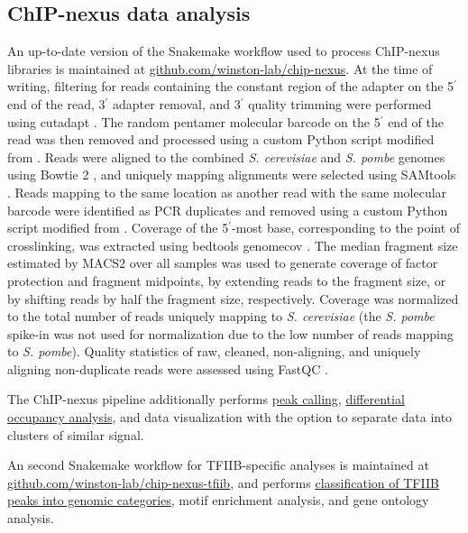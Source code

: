 \subsection{ChIP-nexus data analysis}
\label{subsec:chipnexus}
An up-to-date version of the Snakemake \citep{koster2012} workflow used to process ChIP-nexus libraries is maintained at \href{https://github.com/winston-lab/chip-nexus}{github.com/winston-lab/chip-nexus}.
At the time of writing, filtering for reads containing the constant region of the adapter on the 5$^\prime$ end of the read, 3$^\prime$ adapter removal, and 3$^\prime$ quality trimming were performed using cutadapt \citep{martin2011}.
The random pentamer molecular barcode on the 5$^\prime$ end of the read was then removed and processed using a custom Python script modified from \citet{mayer2015}.
Reads were aligned to the combined \textit{S. cerevisiae} and \textit{S. pombe} genomes using Bowtie 2 \citep{langmead2012}, and uniquely mapping alignments were selected using SAMtools \citep{li2009}.
Reads mapping to the same location as another read with the same molecular barcode were identified as PCR duplicates and removed using a custom Python script modified from \citet{mayer2015}.
Coverage of the 5$^\prime$-most base, corresponding to the point of crosslinking, was extracted using bedtools genomecov \citep{quinlan2010}.
The median fragment size estimated by MACS2 \citep{zhang2008} over all samples was used to generate coverage of factor protection and fragment midpoints, by extending reads to the fragment size, or by shifting reads by half the fragment size, respectively.
Coverage was normalized to the total number of reads uniquely mapping to \textit{S. cerevisiae} (the \textit{S. pombe} spike-in was not used for normalization due to the low number of reads mapping to \textit{S. pombe}).
Quality statistics of raw, cleaned, non-aligning, and uniquely aligning non-duplicate reads were assessed using FastQC \citep{andrews2010}.

The ChIP-nexus pipeline additionally performs \hyperref[subsubsec:nexus_peak_calling]{peak calling}, \hyperref[subsubsec:nexus_differential_occupancy]{differential occupancy analysis}, and data visualization with the option to separate data into clusters of similar signal.

An second Snakemake workflow for TFIIB-specific analyses is maintained at\\\href{https://github.com/winston-lab/chip-nexus-tfiib}{github.com/winston-lab/chip-nexus-tfiib}, and performs \hyperref[subsubsec:tfiib_peak_classification]{classification of TFIIB peaks into genomic categories}, motif enrichment analysis, and gene ontology analysis.

